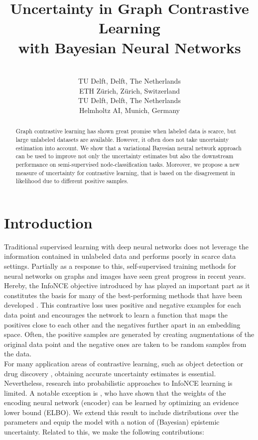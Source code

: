 \documentclass[tablecaption=bottom,wcp]{jmlr} %
\title[Uncertainty in Graph Contrastive Learning with BNNs]{Uncertainty in Graph Contrastive Learning \\ with Bayesian Neural Networks \vspace{0.6em}}
\author{\Name{Alexander Möllers}\nametag{\thanks{Work done while at ETH Zürich. Correspondence to a.j.moellers@gmail.com}} \\
 \addr TU Delft, Delft, The Netherlands
 \AND
 \Name{Alexander Immer} \\
 \addr ETH Zürich, Zürich, Switzerland
 \AND
 \Name{Elvin Isufi} \\
 \addr TU Delft, Delft, The Netherlands
 \AND
 \Name{Vincent Fortuin} \\
 \addr Helmholtz AI, Munich, Germany
 }
\begin{document}
\maketitle

\begin{abstract}
    Graph contrastive learning has shown great promise when labeled data is scarce, but large unlabeled datasets are available. However, it often does not take uncertainty estimation into account. We show that a variational Bayesian  neural network approach can be used to improve not only the uncertainty estimates but also the downstream performance on semi-supervised node-classification tasks. Moreover, we propose a new measure of uncertainty for contrastive learning, that is based on the disagreement in likelihood due to different positive samples.
\end{abstract}



\section{Introduction}
\label{sec:intro}

Traditional supervised learning with deep neural networks does not leverage the information contained in unlabeled data and performs poorly in scarce data settings. Partially as a response to this, self-supervised training methods for neural networks on graphs and images have seen great progress in recent years. Hereby, the InfoNCE objective introduced by \citet{Oord2018} has played an important part as it constitutes the basis for many of the best-performing methods that have been developed \citep{SimCLR,MOCO,GraphCL,Grace}. This contrastive loss uses positive and negative examples for each data point and encourages the network to learn a function that maps the positives close to each other and the negatives further apart in an embedding space. Often, the positive samples are generated by creating augmentations of the original data point and the negative ones are taken to be random samples from the data.  \\

For many application areas of contrastive learning, such as object detection \citep{obdet} or drug discovery \citep{sanchez-fernandez2022contrastive}, obtaining accurate uncertainty estimates is essential. Nevertheless, research into probabilistic approaches to InfoNCE learning is limited. A notable exception is \citet{aitchison2023infonce}, who have shown that the weights of the encoding neural network (encoder) can be learned by optimizing an evidence lower bound (ELBO). We extend this result to include distributions over the parameters and equip the model with a notion of (Bayesian) epistemic uncertainty. Related to this, we make the following contributions: 
\end{document}
